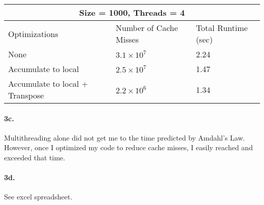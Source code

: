 \documentclass[letterpaper]{article}
\begin{document}
\begin{tabular}{ |p{3cm}||p{3cm}|p{3cm}|  }
 \hline
 \multicolumn{3}{|c|}{Size = 1000, Threads = 4} \\
 \hline
    Optimizations & Number of Cache Misses & Total Runtime (sec) \\
 \hline
 None & $3.1\times10^7$ & 2.24 \\
 \hline
 Accumulate to local &   $2.5 \times 10^7$  & 1.47 \\
 \hline
 Accumulate to local + Transpose &$2.2 \times 10^6$ & 1.34\\
 \hline
\end{tabular}

\paragraph{3c.} Multithreading alone did not get me to the time predicted by
Amdahl's Law. However, once I optimized my code to reduce cache misses, I easily
reached and exceeded that time.

\paragraph{3d.} See excel spreadsheet.
\end{document}
